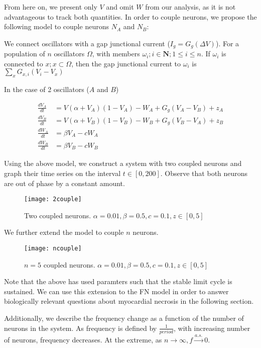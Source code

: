 \documentclass[11pt]{report}
\begin{document}
From here on, we present only $V$ and omit $W$ from our analysis, as it is not advantageous to track both quantities. In order to couple neurons, we propose the following model to couple neurons $N_A$ and $N_B$:


We connect oscillators with a gap junctional current ($I_g = G_g(\Delta V)$). For a population of $n$ oscillators $\Omega$, with members $\omega_i; i\in \textbf{N}; 1\leq i\leq n$. If $\omega_i$ is connected to $x; x\subset\Omega$, then the gap junctional current to $\omega_i$ is $\sum_{x} G_{x,i}(V_i-V_x)$

In the case of 2 oscillators ($A$ and $B$)

$$ \begin{aligned} \frac{dV_A}{dt} &= V(\alpha +V_A)(1-V_A) -W_A + G_g(V_A-V_B) + z_A\\ \frac{dV_B}{dt} &= V(\alpha +V_B)(1-V_B) -W_B + G_g(V_B-V_A) +z_B\\ \frac{dW_A}{dt} &= \beta V_A - cW_A\\ \frac{dW_B}{dt} &= \beta V_B - cW_B
\end{aligned} $$

Using the above model, we construct a system with two coupled neurons and graph their time series on the interval $t \in [0,200]$. Observe that both neurons are out of phase by a constant amount.


\begin{figure}[!ht]
  \caption{Two coupled neurons. $\alpha = 0.01, \beta = 0.5,c = 0.1,z \in [0,5]$ }
  \centering
    \texttt{[image: 2couple]}
\end{figure}

We further extend the model to couple $n$ neurons. 

\begin{figure}[!ht]
  \caption{$n=5$ coupled neurons. $\alpha = 0.01, \beta = 0.5,c = 0.1,z \in [0,5]$ }
  \centering
    \texttt{[image: ncouple]}
\end{figure}

Note that the above has used paramters such that the stable limit cycle is sustained. We can use this extension to the FN model in order to answer biologically relevant questions about myocardial necrosis in the following section. 


Additionally, we describe the frequency change as a function of the number of neurons in the system. As frequency is defined by $\frac{1}{period}$, with increasing number of neurons, frequency decreases. At the extreme, as $n \rightarrow \infty, f \overset{a.s.}{\rightarrow} 0$.
\end{document}
